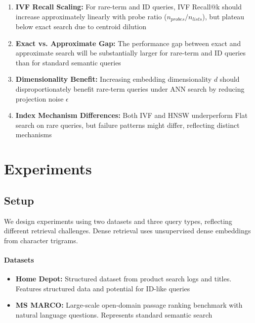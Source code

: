 \documentclass[conference,anonymous]{IEEEtran}
\begin{document}
\begin{enumerate}
\item \textbf{IVF Recall Scaling:} For rare-term and ID queries, IVF Recall@k should increase approximately linearly with probe ratio ($n_{probes}/n_{lists}$), but plateau below exact search due to centroid dilution

\item \textbf{Exact vs. Approximate Gap:} The performance gap between exact and approximate search will be substantially larger for rare-term and ID queries than for standard semantic queries

\item \textbf{Dimensionality Benefit:} Increasing embedding dimensionality $d$ should disproportionately benefit rare-term queries under ANN search by reducing projection noise $\epsilon$

\item \textbf{Index Mechanism Differences:} Both IVF and HNSW underperform Flat search on rare queries, but failure patterns might differ, reflecting distinct mechanisms
\end{enumerate}

\section{Experiments}\label{sec:experiments}

\subsection{Setup}

We design experiments using two datasets and three query types, reflecting different retrieval challenges. Dense retrieval uses unsupervised dense embeddings from character trigrams.

\paragraph{Datasets}
\begin{itemize}
\item \textbf{Home Depot:} Structured dataset from product search logs and titles. Features structured data and potential for ID-like queries

\item \textbf{MS MARCO:} Large-scale open-domain passage ranking benchmark with natural language questions. Represents standard semantic search
\end{itemize}
\end{document}
